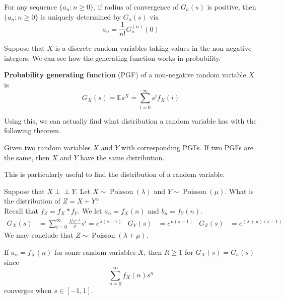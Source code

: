 \documentclass{huhtakm-template-book}
\newcommand{\independent}{\perp\!\!\!\perp}
\newcommand{\expect}{\mathbb{E}}
\DeclareMathOperator{\Poisson}{Poisson}
\begin{document}
\begin{rem}
	For any sequence $\{a_{n}:n\geq 0\}$, if radius of convergence of $G_{a}(s)$ is positive, then $\{a_{n}:n\geq 0\}$ is uniquely determined by $G_{a}(s)$ via
	\begin{equation*}
		a_{n}=\frac{1}{n!}G_{a}^{(n)}(0)
	\end{equation*}
\end{rem}
Suppose that $X$ is a discrete random variables taking values in the non-negative integers. We can see how the generating function works in probability.
\begin{defn}
	\textbf{Probability generating function} (PGF) of a non-negative random variable $X$ is
	\begin{equation*}
		G_{X}(s)=\expect s^{X}=\sum_{i=0}^{\infty}s^{i}f_{X}(i)
	\end{equation*}
\end{defn}
Using this, we can actually find what distribution a random variable has with the following theorem.
\begin{thm}
	Given two random variables $X$ and $Y$ with corresponding PGFs. If two PGFs are the same, then $X$ and $Y$ have the same distribution.
\end{thm}
This is particularly useful to find the distribution of a random variable.
\begin{eg}
	\label{Chapter 7 (Example) Two independent poisson PGF}
	Suppose that $X\independent Y$. Let $X\sim\Poisson(\lambda)$ and $Y\sim\Poisson(\mu)$. What is the distribution of $Z=X+Y$?\\
	Recall that $f_{Z}=f_{X}*f_{Y}$. We let $a_{n}=f_{X}(n)$ and $b_{n}=f_{Y}(n)$.
	\begin{align*}
		G_{X}(s)&=\sum_{i=0}^{\infty}\frac{\lambda^{i}e^{-\lambda}}{i!}s^{i}=e^{\lambda(s-1)} & G_{Y}(s)&=e^{\mu(s-1)} & G_{Z}(s)&=e^{(\lambda+\mu)(s-1)}
	\end{align*}
	We may conclude that $Z\sim\Poisson(\lambda+\mu)$.
\end{eg}
\begin{rem}
	If $a_{n}=f_{X}(n)$ for some random variables $X$, then $R\geq 1$ for $G_{X}(s)=G_{a}(s)$ since
	\begin{equation*}
		\sum_{n=0}^{\infty}f_{X}(n)s^{n}
	\end{equation*}
	converges when $s\in[-1,1]$.
\end{rem}
\end{document}
